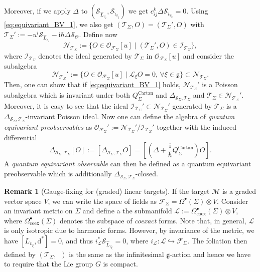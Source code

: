 \documentclass[11pt,colorinlistoftodos]{amsart}
\numberwithin{equation}{subsection}
\theoremstyle{plain}
\theoremstyle{definition}
\newtheorem{rem}[thm]{Remark}
\theoremstyle{remark}
\newcommand{\dd}{{\mathrm{d}}}
\newcommand{\calS}{\mathcal{S}}
\newcommand{\calI}{\mathcal{I}}
\newcommand{\calO}{\mathcal{O}}
\newcommand{\calL}{\mathcal{L}}
\newcommand{\calM}{\mathcal{M}}
\newcommand{\calT}{\mathcal{T}}
\newcommand{\calF}{\mathcal{F}}
\newcommand{\calN}{\mathcal{N}}
\newcommand{\I}{\mathrm{i}}
\begin{document}
Moreover, if we apply $\Delta$ to $(\calS_{\hat{L}_{v_i}},\calS_{\hat{\iota}_{v_j}})$ we get $c^k_{ij}\Delta\calS_{\hat{\iota}_{v_k}}=0$. Using \eqref{eq:equivariant_BV_1}, we also get $(\calT_\Sigma,O)=(\calT_\Sigma',O)$ with $\calT_\Sigma':=-u^i\calS_{\hat{L}_{v_i}}-\I\hbar\Delta\calS_\Theta$. Define now 
\[
\calN_{\calT_\Sigma}:=\{O\in \calO_{\calF_\Sigma}[u]\mid (\calT_\Sigma',O)\in\calI_{\calT_\Sigma}\},
\]
where $\calI_{\calT_\Sigma}$ denotes the ideal generated by $\calT_\Sigma$ in $\calO_{\calF_\Sigma}[u]$ and consider the subalgebra
\[
\calN_{\calT_\Sigma}':=\{O\in\calO_{\calF_\Sigma}[u]\mid \calL_\xi O=0,\, \forall \xi\in\mathfrak{g}\}\subset\calN_{\calT_\Sigma}.
\]
Then, one can show that if \eqref{eq:equivariant_BV_1} holds, $\calN_{\calT_\Sigma}'$ is a Poisson subalgebra which is invariant under both $Q^\mathrm{Cartan}_\Sigma$ and $\Delta_{\calS_{\Sigma},\calT_\Sigma}$ and $\calT_\Sigma\in \calN_{\calT_\Sigma}'$. Moreover, it is easy to see that the ideal $\calI_{\calT_\Sigma}'\subset \calN_{\calT_\Sigma}'$ generated by $\calT_\Sigma$ is a $\Delta_{\calS_\Sigma,\calT_\Sigma}$-invariant Poisson ideal. Now one can define the algebra of \emph{quantum equivariant preobservables} as $\calO_{\calF_\Sigma}':=\calN_{\calT_\Sigma}'/\calI_{\calT_\Sigma}'$ together with the induced differential 
\begin{equation}
    \label{eq:equivariant_BV_2}
    \Delta_{\calS_\Sigma,\calT_\Sigma}[O]:=[\Delta_{\calS_\Sigma,\calT_\Sigma}O]=\left[\left(\Delta+\frac{\I}{\hbar}Q^\mathrm{Cartan}_\Sigma\right)O\right].
\end{equation}
A \emph{quantum equivariant observable} can then be defined as a quantum equivariant preobservable which is additionally $\Delta_{\calS_\Sigma,\calT_\Sigma}$-closed. 

\begin{rem}[Gauge-fixing for (graded) linear targets]
If the target $\calM$ is a graded vector space $V$, we can write the space of fields as $\calF_\Sigma=\Omega^\bullet(\Sigma)\otimes V$. Consider an invariant metric on $\Sigma$ and define a the submanifold $\calL:=\Omega^{\bullet}_\mathrm{coex}(\Sigma)\otimes V$, where $\Omega^\bullet_\mathrm{coex}(\Sigma)$ denotes the subspace of \emph{coexact} forms. Note that, in general, $\calL$ is only isotropic due to harmonic forms. However, by invariance of the metric, we have $[L_{v_\xi},\dd^*]=0$, and thus $i_\calL^*\calS_{\hat{L}_{v_\xi}}=0$, where $i_\calL\colon\calL\hookrightarrow \calF_\Sigma$. The foliation then defined by $(\calT_\Sigma,\enspace)$ is the same as the infinitesimal $\mathfrak{g}$-action and hence we have to require that the Lie group $G$ is compact. 
\end{rem}
\end{document}
